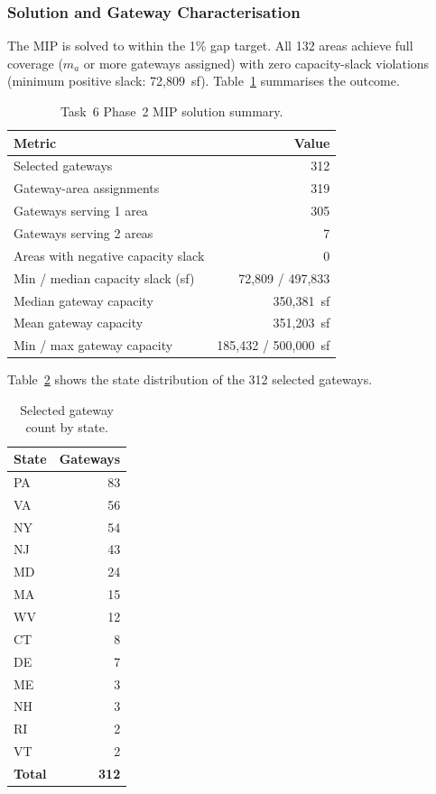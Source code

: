 \subsubsection{Solution and Gateway Characterisation}

The MIP is solved to within the 1\% gap target. All 132 areas achieve full coverage
($m_a$ or more gateways assigned) with zero capacity-slack violations (minimum positive
slack: 72{,}809~sf). Table~\ref{tab:task6-results} summarises the outcome.

\begin{table}[H]
  \centering
  \caption{Task~6 Phase~2 MIP solution summary.}
  \label{tab:task6-results}
  \begin{tabular}{lr}
    \toprule
    Metric & Value \\
    \midrule
    Selected gateways & 312 \\
    Gateway-area assignments & 319 \\
    Gateways serving 1 area & 305 \\
    Gateways serving 2 areas & \phantom{0}7 \\
    Areas with negative capacity slack & 0 \\
    Min / median capacity slack (sf) & 72{,}809 / 497{,}833 \\
    \midrule
    Median gateway capacity & 350{,}381~sf \\
    Mean gateway capacity & 351{,}203~sf \\
    Min / max gateway capacity & 185{,}432 / 500{,}000~sf \\
    \bottomrule
  \end{tabular}
\end{table}

Table~\ref{tab:task6-state} shows the state distribution of the 312 selected gateways.

\begin{table}[H]
  \centering
  \caption{Selected gateway count by state.}
  \label{tab:task6-state}
  \begin{tabular}{lr}
    \toprule
    State & Gateways \\
    \midrule
    PA & 83 \\
    VA & 56 \\
    NY & 54 \\
    NJ & 43 \\
    MD & 24 \\
    MA & 15 \\
    WV & 12 \\
    CT & \phantom{0}8 \\
    DE & \phantom{0}7 \\
    ME & \phantom{0}3 \\
    NH & \phantom{0}3 \\
    RI & \phantom{0}2 \\
    VT & \phantom{0}2 \\
    \midrule
    \textbf{Total} & \textbf{312} \\
    \bottomrule
  \end{tabular}
\end{table}

